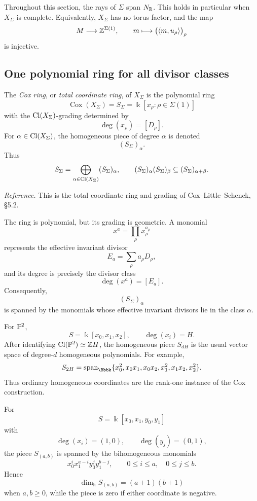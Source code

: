 Throughout this section, the rays of \(\Sigma\) span \(N_{\mathbb{R}}\). This
holds in particular when \(X_\Sigma\) is complete. Equivalently,
\(X_\Sigma\) has no torus factor, and the map
\[
M\longrightarrow \mathbb{Z}^{\Sigma(1)},
\qquad
m\longmapsto
\bigl(\langle m,u_\rho\rangle\bigr)_\rho
\]
is injective.

\subsection{One polynomial ring for all divisor classes}

\begin{definition}
\label{def:toric-cox-ring}
The \emph{Cox ring}, or \emph{total coordinate ring}, of
\(X_\Sigma\) is the polynomial ring
\[
\operatorname{Cox}(X_\Sigma)
=
S_\Sigma
=
\Bbbk[x_\rho:\rho\in\Sigma(1)]
\]
with the \(\operatorname{Cl}(X_\Sigma)\)-grading determined by
\[
\deg(x_\rho)=[D_\rho].
\]
For \(\alpha\in\operatorname{Cl}(X_\Sigma)\), the homogeneous piece of degree
\(\alpha\) is denoted
\[
(S_\Sigma)_\alpha.
\]
Thus
\[
S_\Sigma
=
\bigoplus_{\alpha\in\operatorname{Cl}(X_\Sigma)}
(S_\Sigma)_\alpha,
\qquad
(S_\Sigma)_\alpha(S_\Sigma)_\beta
\subseteq
(S_\Sigma)_{\alpha+\beta}.
\]
\end{definition}

\noindent
\textit{Reference.}
This is the total coordinate ring and grading of
Cox--Little--Schenck, \S5.2.

The ring is polynomial, but its grading is geometric. A monomial
\[
x^a=\prod_\rho x_\rho^{a_\rho}
\]
represents the effective invariant divisor
\[
E_a=\sum_\rho a_\rho D_\rho,
\]
and its degree is precisely the divisor class
\[
\deg(x^a)=[E_a].
\]
Consequently,
\[
(S_\Sigma)_\alpha
\]
is spanned by the monomials whose effective invariant divisors lie in
the class \(\alpha\).

\begin{example}
For \(\mathbb{P}^2\),
\[
S=\Bbbk[x_0,x_1,x_2],
\qquad
\deg(x_i)=H.
\]
After identifying \(\operatorname{Cl}(\mathbb{P}^2)\simeq\mathbb{Z} H\), the homogeneous piece
\(S_{dH}\) is the usual vector space of degree-\(d\) homogeneous
polynomials. For example,
\[
S_{2H}
=
\Span_\Bbbk
\{x_0^2,x_0x_1,x_0x_2,x_1^2,x_1x_2,x_2^2\}.
\]
Thus ordinary homogeneous coordinates are the rank-one instance of
the Cox construction.
\end{example}

\begin{example}
For
\[
S=\Bbbk[x_0,x_1,y_0,y_1]
\]
with
\[
\deg(x_i)=(1,0),
\qquad
\deg(y_j)=(0,1),
\]
the piece \(S_{(a,b)}\) is spanned by the bihomogeneous monomials
\[
x_0^i x_1^{a-i}y_0^j y_1^{b-j},
\qquad
0\leq i\leq a,
\quad
0\leq j\leq b.
\]
Hence
\[
\dim_\Bbbk S_{(a,b)}=(a+1)(b+1)
\]
when \(a,b\geq0\), while the piece is zero if either coordinate is
negative.
\end{example}


